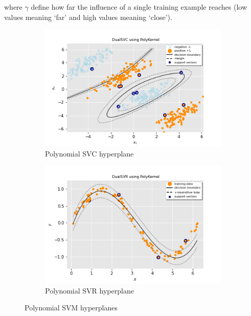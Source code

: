 where $\gamma$ define how far the influence of a single training example reaches (low values meaning ‘far’ and high values meaning ‘close’).

\begin{figure}[h!]
	\centering
	\begin{subfigure}{.49\textwidth}
		\centering
		\includegraphics[width=\textwidth]{img/poly_dual_l1_svc_hyperplane}
		\caption{Polynomial SVC hyperplane}
		\label{fig:poly_dual_l1_svc_hyperplane}
	\end{subfigure}
	\begin{subfigure}{.49\textwidth}
		\centering
		\captionsetup{justification=centering}
		\includegraphics[width=\textwidth]{img/poly_dual_l1_svr_hyperplane}
		\caption{Polynomial SVR hyperplane}
		\label{fig:poly_dual_l1_svr_hyperplane}
	\end{subfigure}
\caption{Polynomial SVM hyperplanes}
\end{figure}

